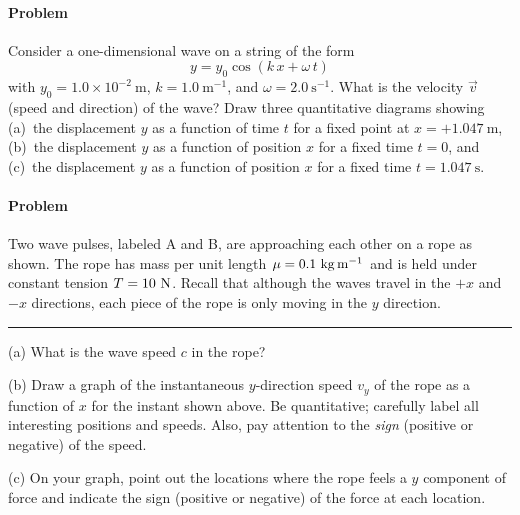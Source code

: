 \documentclass[12pt]{article}
\begin{document}
\paragraph{Problem~\theproblem}%
Consider a one-dimensional wave on a string of the form
\begin{equation}
y = y_0 \cos(k\,x + \omega\,t)
\end{equation}
with $y_0= 1.0\times 10^{-2}~\mathrm{m}$, $k= 1.0~\mathrm{m^{-1}}$,
and $\omega= 2.0~\mathrm{s^{-1}}$.  What is the velocity $\vec{v}$
(speed and direction) of the wave?  Draw three quantitative diagrams
showing (a)~the displacement $y$ as a function of time $t$ for a fixed
point at $x= +1.047~\mathrm{m}$, (b)~the displacement $y$ as a
function of position $x$ for a fixed time $t=0$, and (c)~the
displacement $y$ as a function of position $x$ for a fixed time $t=
1.047~\mathrm{s}$.

\paragraph{Problem~\theproblem}%
Two wave pulses, labeled A and B, are approaching each other on a rope
as shown.  The rope has mass per unit length $\mu= 0.1~{\rm
kg\,m^{-1}}$ and is held under constant tension $T= 10~{\rm N}$.
Recall that although the waves travel in the $+x$ and $-x$ directions,
each piece of the rope is only moving in the $y$ direction.
\\ \rule{0.1\textwidth}{0pt}

(a) What is the wave speed $c$ in the rope?

(b) Draw a graph of the instantaneous $y$-direction speed $v_y$ of the
rope as a function of $x$ for the instant shown above.  Be
quantitative; carefully label all interesting positions and speeds.
Also, pay attention to the {\em sign} (positive or negative) of the
speed.

(c) On your graph, point out the locations where the rope feels a $y$
component of force and indicate the sign (positive or negative) of the
force at each location.
\end{document}
